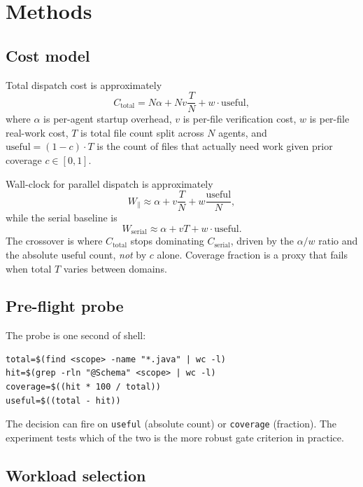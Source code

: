 \documentclass[10pt,letterpaper]{article}
\begin{document}
\section{Methods}
\label{sec:methods}

\subsection{Cost model}

Total dispatch cost is approximately
\begin{equation}
C_{\text{total}} = N\alpha + Nv\frac{T}{N} + w \cdot \mathrm{useful},
\end{equation}
where $\alpha$ is per-agent startup overhead, $v$ is per-file
verification cost, $w$ is per-file real-work cost, $T$ is total file
count split across $N$ agents, and $\mathrm{useful} = (1 - c) \cdot T$
is the count of files that actually need work given prior coverage
$c \in [0, 1]$.

Wall-clock for parallel dispatch is approximately
\begin{equation}
W_{\parallel} \approx \alpha + v \frac{T}{N} + w \frac{\mathrm{useful}}{N},
\end{equation}
while the serial baseline is
\begin{equation}
W_{\text{serial}} \approx \alpha + vT + w \cdot \mathrm{useful}.
\end{equation}
The crossover is where $C_{\text{total}}$ stops dominating
$C_{\text{serial}}$, driven by the $\alpha/w$ ratio and the absolute
$\mathrm{useful}$ count, \emph{not} by $c$ alone. Coverage fraction is a
proxy that fails when total $T$ varies between domains.

\subsection{Pre-flight probe}

The probe is one second of shell:
\begin{verbatim}
total=$(find <scope> -name "*.java" | wc -l)
hit=$(grep -rln "@Schema" <scope> | wc -l)
coverage=$((hit * 100 / total))
useful=$((total - hit))
\end{verbatim}
The decision can fire on \texttt{useful} (absolute count) or
\texttt{coverage} (fraction). The experiment tests which of the two is the
more robust gate criterion in practice.

\subsection{Workload selection}
\label{sec:workloads}
\end{document}
